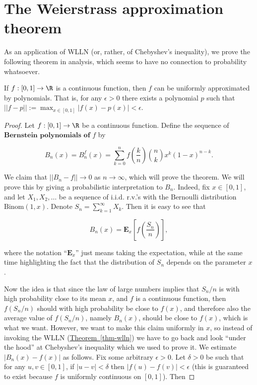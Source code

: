 \section{The Weierstrass approximation theorem}

As an application of WLLN (or, rather, of Chebyshev's
inequality), we prove the following theorem in
analysis, which seems to have no connection to
probability whatsoever.

\begin{thm}
If $f:[0,1]\to\R$ is a continuous function, then $f$
can be uniformly approximated by polynomials. That is,
for any $\epsilon>0$ there exists a polynomial $p$
such that
$||f-p||:=\max_{x\in[0,1]}|f(x)-p(x)|<\epsilon$.
\end{thm}

\begin{proof}
Let $f:[0,1]\to\R$ be a continuous function. Define
the sequence of $\textbf{Bernstein polynomials of } f$
by

\[
B_n(x)= B_n^f(x) = \sum_{k=0}^n f\left(\frac{k}{n}\right) \binom{n}{k} x^k (1-x)^{n-k}.
\]

\noindent We claim that $||B_n-f||\to 0$ as $n\to\infty$, which
will prove the theorem. We will prove this by giving a
probabilistic interpretation to $B_n$. Indeed, fix
$x\in [0,1]$, and let $X_1,X_2,\ldots$ be a sequence
of i.i.d. r.v.'s with the Bernoulli distribution
$\textrm{Binom}(1,x)$. Denote
$S_n=\sum_{k=1}^\infty X_k$. Then it is easy to see
that

\[
B_n(x) = \mathbf{E}_x \left[f\left(\frac{S_n}{n}\right)\right],
\]

\noindent where the notation ``$\mathbf{E}_x$'' just means
taking the expectation, while at the same time
highlighting the fact that the distribution of $S_n$
depends on the parameter $x$.

Now the idea is that since the law of large numbers
implies that $S_n/n$ is with high probability close
to its mean $x$, and $f$ is a continuous function,
then $f(S_n/n)$ should with high probability be close
to $f(x)$, and therefore also the average value of
$f(S_n/n)$, namely $B_n(x)$, should be close to
$f(x)$, which is what we want. However, we want to
make this claim uniformly in $x$, so instead of
invoking the WLLN (\hyperref[thm-wlln]{Theorem~\ref*{thm-wlln}}) we have to go
back and look ``under the hood'' at Chebyshev's
inequality which we used to prove it. We estimate
$|B_n(x)-f(x)|$ as follows. Fix some arbitrary
$\epsilon>0$. Let $\delta>0$ be such that for any
$u,v\in[0,1]$, if $|u-v|<\delta$ then
$|f(u)-f(v)|<\epsilon$ (this is guaranteed to exist
because $f$ is uniformly continuous on $[0,1]$). Then


\end{proof}
